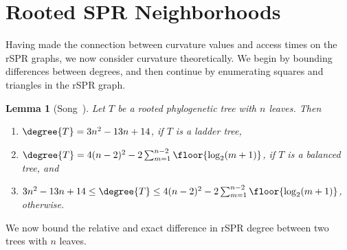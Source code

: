 \documentclass[11pt,onecolumn,conference]{IEEEtran}
\newtheorem{lemma}[theorem]{Lemma}
\begin{document}
\section{Rooted SPR Neighborhoods}
Having made the connection between curvature values and access times on the rSPR graphs, we now consider curvature theoretically.
We begin by bounding differences between degrees, and then continue by enumerating squares and triangles in the rSPR graph.

\begin{lemma}[{Song~\cite{Song2003-gf}}]
    \pushQED{\qed}
	\label{lem:degree_extremes}
	Let $T$ be a rooted phylogenetic tree with $n$ leaves. Then
	\begin{enumerate}
		\item $\degree{T} = 3n^2 - 13n + 14$, if $T$ is a ladder tree,
		\item $\degree{T} = 4(n-2)^2 - 2 \sum_{m=1}^{n-2} \floor{\log_2(m+1)}$, if $T$ is a balanced tree, and
		\item  $3n^2 - 13n + 14 \le \degree{T} \le 4(n-2)^2 - 2 \sum_{m=1}^{n-2} \floor{\log_2(m+1)}$, otherwise.
	\end{enumerate}
    \popQED
\end{lemma}

We now bound the relative and exact difference in rSPR degree between two trees with $n$ leaves.
\end{document}

